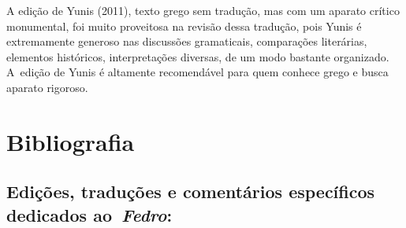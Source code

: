 A edição de Yunis (2011), texto grego sem tradução, mas com um aparato
crítico monumental, foi muito proveitosa na revisão dessa tradução, pois
Yunis é extremamente generoso nas discussões gramaticais, comparações
literárias, elementos históricos, interpretações diversas, de um modo
bastante organizado. A~edição de Yunis é altamente recomendável para
quem conhece grego e busca aparato rigoroso.

 

\section{Bibliografia}

\subsection{Edições, traduções e comentários específicos dedicados
ao~\emph{Fedro}:}

 

